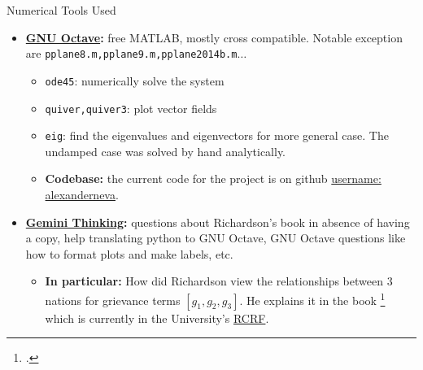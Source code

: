 \documentclass{beamer}
\begin{document}
\begin{frame}{Numerical Tools Used}
  \begin{itemize}
    \item \textbf{\href{https://octave.org/}{GNU Octave}:} free MATLAB, mostly cross compatible. Notable exception are \texttt{pplane8.m,pplane9.m,pplane2014b.m}$\dots$
      \begin{itemize}
	\item \texttt{ode45}: numerically solve the system
	\item \texttt{quiver,quiver3}: plot vector fields 
	\item \texttt{eig}: find the eigenvalues and eigenvectors for more general case. The undamped case was solved by hand analytically.
	\item \textbf{Codebase:} the current code for the project is on github \href{https://github.com/alexanderneva/math_572_project}{username: alexanderneva}.
      \end{itemize}
    \item \textbf{\href{https://gemini.google.com/app}{Gemini Thinking}:} questions about Richardson's book in absence of having a copy, help translating python to GNU Octave, GNU Octave questions like how to format plots and make labels, etc.
      \begin{itemize}
	\item \textbf{In particular: } How did Richardson view the relationships between 3 nations for grievance terms $\left[g_1,g_2,g_3\right]$. He explains it in the book \footcite{richardson1960arms} which is currently in the University's \href{https://www.ualberta.ca/en/facilities/f225-research--collection-resource-facility.html}{RCRF}.
      \end{itemize}
  \end{itemize}
\end{frame}
\end{document}
